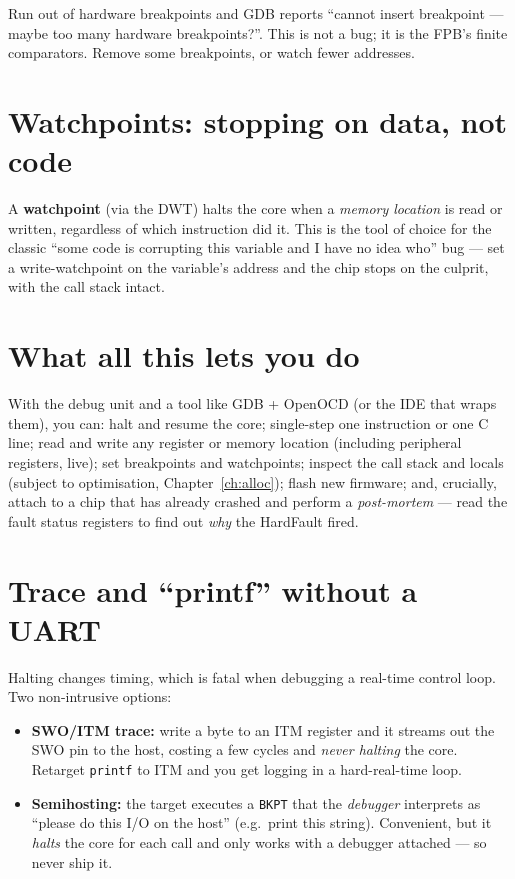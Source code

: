 \documentclass[11pt,a4paper,oneside]{book}
\newcommand{\code}[1]{\texttt{#1}}
\begin{document}
\begin{warning}
Run out of hardware breakpoints and GDB reports ``cannot insert breakpoint ---
maybe too many hardware breakpoints?''. This is not a bug; it is the FPB's
finite comparators. Remove some breakpoints, or watch fewer addresses.
\end{warning}

\section{Watchpoints: stopping on data, not code}
A \textbf{watchpoint} (via the DWT) halts the core when a \emph{memory location}
is read or written, regardless of which instruction did it. This is the tool of
choice for the classic ``some code is corrupting this variable and I have no
idea who'' bug --- set a write-watchpoint on the variable's address and the chip
stops on the culprit, with the call stack intact.

\section{What all this lets you do}
With the debug unit and a tool like GDB + OpenOCD (or the IDE that wraps them),
you can: halt and resume the core; single-step one instruction or one C line;
read and write any register or memory location (including peripheral registers,
live); set breakpoints and watchpoints; inspect the call stack and locals
(subject to optimisation, Chapter~\ref{ch:alloc}); flash new firmware; and,
crucially, attach to a chip that has already crashed and perform a
\emph{post-mortem} --- read the fault status registers to find out \emph{why}
the HardFault fired.

\section{Trace and ``printf'' without a UART}
Halting changes timing, which is fatal when debugging a real-time control loop.
Two non-intrusive options:
\begin{itemize}[leftmargin=1.4cm]
  \item \textbf{SWO/ITM trace:} write a byte to an ITM register and it streams
        out the SWO pin to the host, costing a few cycles and \emph{never
        halting} the core. Retarget \code{printf} to ITM and you get logging in
        a hard-real-time loop.
  \item \textbf{Semihosting:} the target executes a \code{BKPT} that the
        \emph{debugger} interprets as ``please do this I/O on the host''
        (e.g.\ print this string). Convenient, but it \emph{halts} the core for
        each call and only works with a debugger attached --- so never ship it.
\end{itemize}
\end{document}
